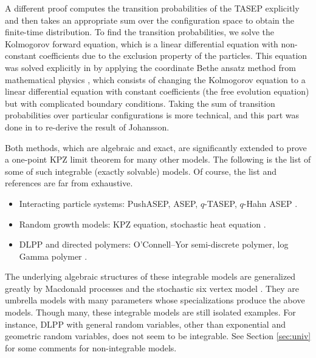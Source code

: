 \documentclass[10pt]{article}
\theoremstyle{plain}
\theoremstyle{definition}
\numberwithin{equation}{section}
\begin{document}
A different proof computes the transition probabilities of the TASEP explicitly and then takes an appropriate sum over the configuration space to obtain the finite-time distribution.
To find the transition probabilities, we solve the Kolmogorov forward equation, which is a linear differential equation with non-constant coefficients due to the exclusion property of the particles. 
This equation was solved explicitly in \cite{Schutz97} by applying the coordinate Bethe ansatz method from mathematical physics \cite{Gaudin14, Sutherland04}, which consists of changing the Kolmogorov equation to a linear differential equation with constant coefficients (the free evolution equation) but with complicated boundary conditions. 
Taking the sum of transition probabilities over particular configurations is more technical, and this part was done in \cite{Nagao-Sasamoto04, Rakos-Schutz05} to re-derive the result of Johansson. 

Both methods, which are algebraic and exact, are significantly extended to prove a one-point KPZ limit theorem for many other models. 
The following is the list of some of such integrable (exactly solvable) models. Of course, the list and references are far from exhaustive. 

\begin{itemize}
\item Interacting particle systems: PushASEP, ASEP, $q$-TASEP, $q$-Hahn ASEP \cite{Borodin-Ferrari08, Tracy-Widom09, Borodin-Ferrari14, Barraquand-Corwin16}. 
\item Random growth models: KPZ equation, stochastic heat equation  \cite{Amir-Corwin-Quastel11, Borodin-Corwin-Ferrari-Veto15}.
\item DLPP and directed polymers: O'Connell--Yor semi-discrete polymer, log Gamma polymer \cite{O'Connell12, Borodin-Corwin-Remenik13, Borodin-Corwin-Ferrari14}. 
\end{itemize}

The underlying algebraic structures of these integrable models are  generalized greatly by Macdonald processes \cite{Borodin-Corwin13} and the stochastic six vertex model  \cite{Borodin-Corwin-Gorin16, Corwin-Petrov16}. 
They are umbrella models with many parameters whose specializations produce the above models.  Though many, these integrable models are still isolated examples. For instance, DLPP with general random variables, other than exponential and geometric random variables, does not seem to be integrable.  
See Section \ref{sec:univ} for some comments for non-integrable models. 
\end{document}
